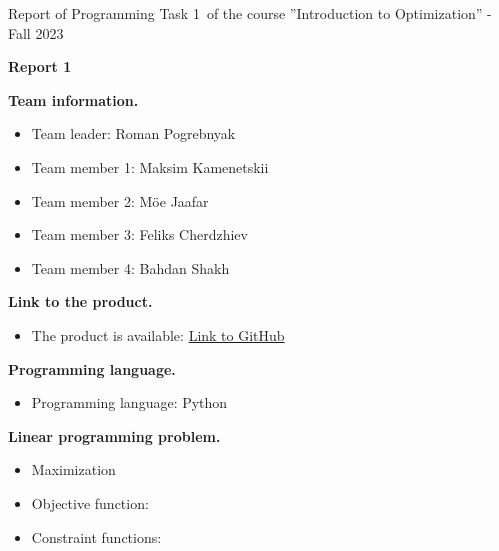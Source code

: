 \documentclass[12pt, legalpaper]{exam}
\newcommand{\course}{Introduction to Optimization}
\newcommand{\term}{Fall 2023}
\newcommand{\examnum}{Report of Programming Task 1}
\begin{document}
\noindent \examnum \, of the  course ''\course'' - \term


\noindent
{}




\vspace{12pt}
\begin{center}
    \textbf{Report 1}
\end{center}

\vspace{12pt}

\noindent  \textbf{Team information.}

\begin{itemize}
    \item Team leader: Roman Pogrebnyak
    \item Team member 1: Maksim Kamenetskii
    \item Team member 2: Möe Jaafar
    \item Team member 3: Feliks Cherdzhiev
    \item Team member 4: Bahdan Shakh
\end{itemize}
\vspace{12pt}
\noindent     \textbf{Link to the product.}
\begin{itemize}
    \item The product is available: \href{https://github.com/OptimizationAssignmentsIU3Sem/Simplex_assignment1/tree/main}{Link to GitHub}
\end{itemize}

\vspace{12pt}

\noindent  \textbf{Programming language.}
\begin{itemize}
    \item Programming language: Python
\end{itemize}

\vspace{12pt}

\noindent  \textbf{Linear programming problem.}
\begin{itemize}
\item Maximization
\vspace{10pt}
    \item Objective function:
    \vspace{10pt}
    \item Constraint functions:
    \vspace{5cm}
\end{itemize}
\end{document}
